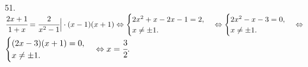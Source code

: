 51. $\cfrac{2x+1}{1+x}=\cfrac{2}{x^2-1}\Big|\cdot(x-1)(x+1)\Leftrightarrow\begin{cases}2x^2+x-2x-1=2,\\x\neq\pm1.\end{cases}
\Leftrightarrow\begin{cases}2x^2-x-3=0,\\x\neq\pm1.\end{cases}\Leftrightarrow$\\$\begin{cases}(2x-3)(x+1)=0,\\x\neq\pm1.\end{cases}\Leftrightarrow x=\cfrac{3}{2}.$\\
